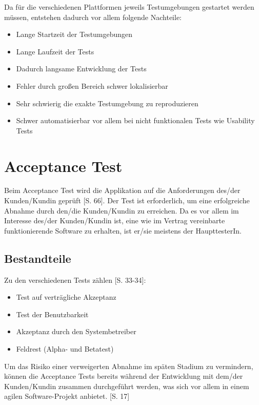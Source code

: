 \documentclass[a4paper,bibtotoc,oneside]{scrbook}
\begin{document}
Da für die verschiedenen Plattformen jeweils Testumgebungen gestartet werden müssen, entstehen dadurch vor allem folgende Nachteile:

\begin{itemize}
  \item Lange Startzeit der Testumgebungen
  \item Lange Laufzeit der Tests
  \item Dadurch langsame Entwicklung der Tests
  \item Fehler durch großen Bereich schwer lokalisierbar
  \item Sehr schwierig die exakte Testumgebung zu reproduzieren
  \item Schwer automatisierbar vor allem bei nicht funktionalen Tests wie Usability Tests
\end{itemize}


\chapter{Acceptance Test}
Beim Acceptance Test wird die Applikation auf die Anforderungen des/der Kunden/Kundin geprüft \cite{test_large_systems}[S. 66]. Der Test ist erforderlich, um eine erfolgreiche Abnahme durch den/die Kunden/Kundin zu erreichen. Da es vor allem im Interesse des/der Kunden/Kundin ist, eine wie im Vertrag vereinbarte funktionierende Software zu erhalten, ist er/sie meistens der HaupttesterIn.

\section{Bestandteile}
Zu den verschiedenen Tests zählen \cite{betrieb}[S. 33-34]:

\begin{itemize}
   \item \glqq Test auf verträgliche Akzeptanz\grqq
   \item \glqq Test der Benutzbarkeit\grqq
   \item \glqq Akzeptanz durch den Systembetreiber\grqq
   \item \glqq Feldrest (Alpha- und Betatest)\grqq
 \end{itemize} 

Um das Risiko einer verweigerten Abnahme im späten Stadium zu vermindern, können die Acceptance Tests bereits während der Entwicklung mit dem/der Kunden/Kundin zusammen durchgeführt werden, was sich vor allem in einem agilen Software-Projekt anbietet. \cite{eval_regression}[S. 17]
\end{document}
